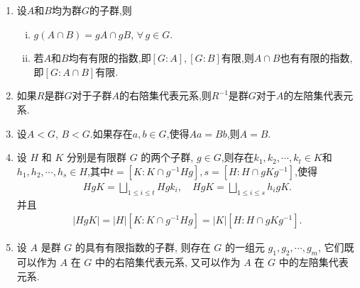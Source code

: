 \documentclass[../../main.tex]{subfiles}%
\begin{document}
\begin{proposition}\label{proposition:左右陪集的基本性质}
\begin{enumerate}[(1)]
\item\label{proposition:左右陪集的基本性质-1} 设$A$和$B$均为群$G$的子群,则
\begin{enumerate}[(i)]
\item\label{proposition:左右陪集的基本性质-1-1} $g(A\cap B)=gA\cap gB$, $\forall\,g\in G$.

\item\label{proposition:左右陪集的基本性质-1-2} 若$A$和$B$均有有限的指数,即$[G:A],[G:B]$有限,则$A\cap B$也有有限的指数,即$[G:A\cap B]$有限.
\end{enumerate}

\item\label{proposition:左右陪集的基本性质-2} 如果$R$是群$G$对于子群$A$的右陪集代表元系,则$R^{-1}$是群$G$对于$A$的左陪集代表元系.

\item\label{proposition:左右陪集的基本性质-3} 设$A< G$, $B<G$.如果存在$a,b\in G$,使得$Aa=Bb$,则$A=B$.

\item\label{proposition:左右陪集的基本性质-4} 设 $H$ 和 $K$ 分别是有限群 $G$ 的两个子群, $g\in G$,则存在$k_1,k_2,\cdots,k_t\in K$和$h_1,h_2,\cdots,h_s\in H$,其中$t=[K:K\cap g^{-1}Hg],s=[H:H\cap gKg^{-1}]$,使得
\begin{gather*}
HgK=\bigsqcup_{1\leqslant i\leqslant t}{Hgk_i},\quad
HgK=\bigsqcup_{1\leqslant i\leqslant s}{h_igK}.
\end{gather*}
并且
\begin{gather*}
|HgK| = |H|[K : K\cap g^{-1}Hg] = |K|[H : H\cap gKg^{-1}].
\end{gather*}

\item\label{proposition:左右陪集的基本性质-5} 设 $A$ 是群 $G$ 的具有有限指数的子群, 则存在 $G$ 的一组元 $g_1,g_2,\cdots,g_m$, 它们既可以作为 $A$ 在 $G$ 中的右陪集代表元系, 又可以作为 $A$ 在 $G$ 中的左陪集代表元系.
\end{enumerate}
\end{proposition}
\end{document}
